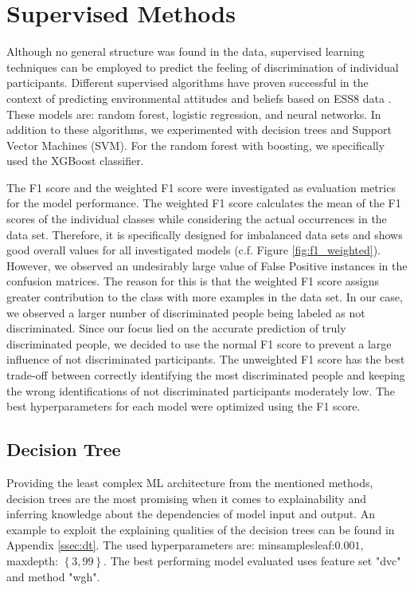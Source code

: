 \documentclass[10pt]{article}
\begin{document}
	\section{Supervised Methods} %
	Although no general structure was found in the data, supervised learning techniques can be employed to predict the feeling of discrimination of individual participants. Different supervised algorithms have proven successful in the context of predicting environmental attitudes and beliefs based on ESS8 data \citep{yektansani:2021}. These models are: random forest, logistic  regression, and neural networks. In addition to these algorithms, we experimented with decision trees and Support Vector Machines (SVM). For the random forest with boosting, we specifically used the XGBoost classifier.
	
	The F1 score and the weighted F1 score were investigated as evaluation metrics for the model performance. The weighted F1 score calculates the mean of the F1 scores of the individual classes while considering the actual occurrences in the data set. Therefore, it is specifically designed for imbalanced data sets and shows good overall values for all investigated models (c.f. Figure 			\ref{fig:f1_weighted}). However, we observed an undesirably large value of False Positive instances in the confusion matrices. The reason for this is that the weighted F1 score assigns greater contribution to the class with more examples in the data set. In our case, we observed a larger number of discriminated people being labeled as not discriminated. Since our focus lied on the 		accurate prediction of truly discriminated people, we decided to use the normal F1 score to prevent a large influence of not discriminated participants. The unweighted F1 score has the best trade-off between correctly identifying the most discriminated people and keeping the wrong identifications of not discriminated participants moderately low. The best hyperparameters for each model were optimized using the F1 score. 
	
	\subsection{Decision Tree} %
	Providing the least complex ML architecture from the mentioned methods, decision trees are the most promising when it comes to explainability and inferring knowledge about the dependencies of model input and output. An example to exploit the explaining qualities of the decision trees can be found in Appendix \ref{ssec:dt}. The used hyperparameters are: min\textunderscore samples\textunderscore leaf:$0.001$, max\textunderscore depth: $\left\{3, 99\right\}$. The best performing model evaluated uses feature set "dvc" and method "wgh".
	
\end{document}
